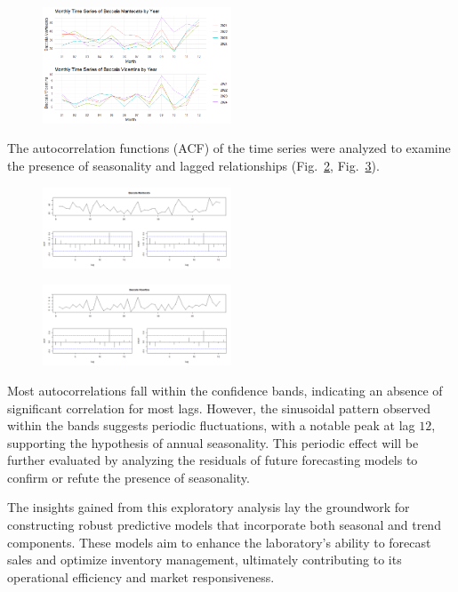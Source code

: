 \documentclass[10pt,twocolumn,letterpaper]{article}
\begin{document}
\begin{figure}[h!]
    \centering
    \includegraphics[width=0.5\textwidth]{PlotsBEFD/Month_SS_MAN_VIC.png} 
    \caption{}
    \label{fig:Month_SS_MAN_VIC}
\end{figure}

The autocorrelation functions (ACF) of the time series were analyzed to examine the presence of seasonality and lagged relationships (Fig.~\ref{fig:ACF_MAN}, Fig.~\ref{fig:ACF_VIC}).
\begin{figure}[h!]
    \centering
    \includegraphics[width=0.5\textwidth]{PlotsBEFD/ACF_MAN.png} 
    \caption{}
    \label{fig:ACF_MAN}
\end{figure}
\begin{figure}[h!]
    \centering
    \includegraphics[width=0.5\textwidth]{PlotsBEFD/ACF_VIC.png} 
    \caption{}
    \label{fig:ACF_VIC}
\end{figure}

Most autocorrelations fall within the confidence bands, indicating an absence of significant correlation for most lags. However, the sinusoidal pattern observed within the bands suggests periodic fluctuations, with a notable peak at lag $12$, supporting the hypothesis of annual seasonality. This periodic effect will be further evaluated by analyzing the residuals of future forecasting models to confirm or refute the presence of seasonality.

The insights gained from this exploratory analysis lay the groundwork for constructing robust predictive models that incorporate both seasonal and trend components. These models aim to enhance the laboratory's ability to forecast sales and optimize inventory management, ultimately contributing to its operational efficiency and market responsiveness.
\end{document}
